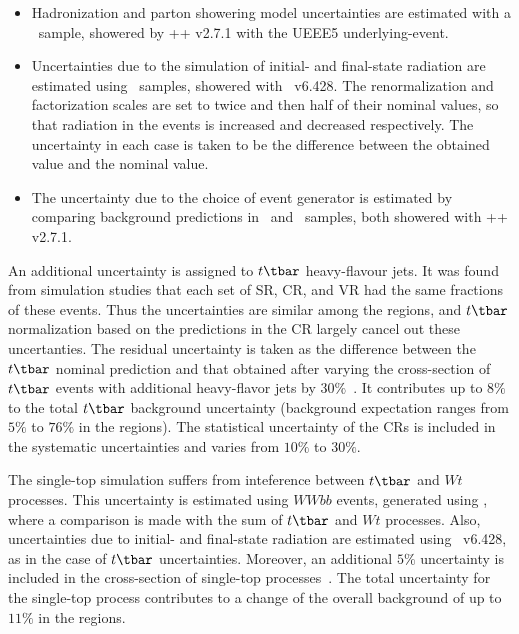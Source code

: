 \begin{itemize}[label=]

	\item Hadronization and parton showering model uncertainties are estimated with
	      a \POWHEG~sample, showered by \MYHERWIG++ v2.7.1 with the UEEE5
	      underlying-event.

	\item Uncertainties due to the simulation of initial- and final-state radiation
	      are estimated using \POWHEG~samples, showered with \PYTHIA~v6.428. The
	      renormalization and factorization scales are set to twice and then half of
	      their nominal values, so that radiation in the events is increased and
	      decreased respectively. The uncertainty in each case is taken to be the
	      difference between the obtained value and the nominal value.

	\item The uncertainty due to the choice of event generator is estimated by
	      comparing background predictions in \MGMCatNLO~and \POWHEG~samples, both
	      showered with \MYHERWIG++ v2.7.1.

\end{itemize}

An additional uncertainty is assigned to $t\tbar$ heavy-flavour jets. It was
found from simulation studies that each set of SR, CR, and VR had the same
fractions of these events. Thus the uncertainties are similar among the
regions, and $t\tbar$ normalization based on the predictions in the CR largely
cancel out these uncertanties. The residual uncertainty is taken as the
difference between the $t\tbar$ nominal prediction and that obtained after
varying the cross-section of $t\tbar$ events with additional heavy-flavor jets
by $30\%$~\cite{TOPQ-2014-10}. It contributes up to $8\%$ to the total $t\tbar$
background uncertainty (background expectation ranges from $5\%$ to $76\%$ in
the regions). The statistical uncertainty of the CRs is included in the
systematic uncertainties and varies from $10\%$ to $30\%$.

The single-top simulation suffers from inteference between $t\tbar$ and $Wt$
processes. This uncertainty is estimated using $WWbb$ events, generated using
\MGMCatNLO, where a comparison is made with the sum of $t\tbar$ and $Wt$
processes. Also, uncertainties due to initial- and final-state radiation are
estimated using \PYTHIA~v6.428, as in the case of $t\tbar$ uncertainties.
Moreover, an additional $5\%$ uncertainty is included in the cross-section of
single-top processes~\cite{TOPQ-2014-10}. The total uncertainty for the
single-top process contributes to a change of the overall background of up to
$11\%$ in the regions.

